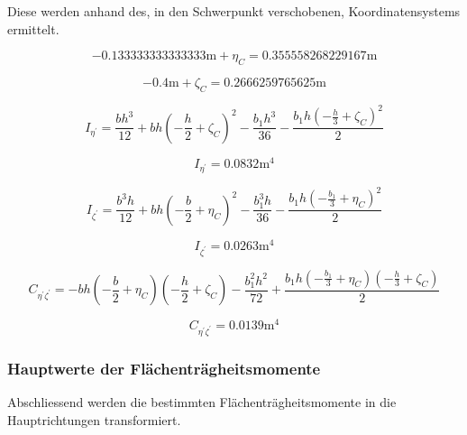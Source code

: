 \documentclass[
  12pt,
  letterpaper,
  DIV=11,
  egregdoesnotlikesansseriftitles]{scrartcl}
\begin{document}
Diese werden anhand des, in den Schwerpunkt verschobenen,
Koordinatensystems ermittelt.

\begin{equation}- 0.133333333333333 \text{m} + \eta_{C} = 0.355558268229167 \text{m}\end{equation}

\begin{equation}- 0.4 \text{m} + \zeta_{C} = 0.2666259765625 \text{m}\end{equation}

\begin{equation}I_{\eta^{'}} = \frac{b h^{3}}{12} + b h \left(- \frac{h}{2} + \zeta_{C}\right)^{2} - \frac{b_{1} h^{3}}{36} - \frac{b_{1} h \left(- \frac{h}{3} + \zeta_{C}\right)^{2}}{2}\end{equation}

\begin{equation}I_{\eta^{'}} = 0.0832 \text{m}^{4}\end{equation}

\begin{equation}I_{\zeta^{'}} = \frac{b^{3} h}{12} + b h \left(- \frac{b}{2} + \eta_{C}\right)^{2} - \frac{b_{1}^{3} h}{36} - \frac{b_{1} h \left(- \frac{b_{1}}{3} + \eta_{C}\right)^{2}}{2}\end{equation}

\begin{equation}I_{\zeta^{'}} = 0.0263 \text{m}^{4}\end{equation}

\begin{equation}C_{\eta^{'}\zeta^{'}} = - b h \left(- \frac{b}{2} + \eta_{C}\right) \left(- \frac{h}{2} + \zeta_{C}\right) - \frac{b_{1}^{2} h^{2}}{72} + \frac{b_{1} h \left(- \frac{b_{1}}{3} + \eta_{C}\right) \left(- \frac{h}{3} + \zeta_{C}\right)}{2}\end{equation}

\begin{equation}C_{\eta^{'}\zeta^{'}} = 0.0139 \text{m}^{4}\end{equation}

\hypertarget{hauptwerte-der-fluxe4chentruxe4gheitsmomente}{%
\subsubsection{Hauptwerte der
Flächenträgheitsmomente}\label{hauptwerte-der-fluxe4chentruxe4gheitsmomente}}

Abschliessend werden die bestimmten Flächenträgheitsmomente in die
Hauptrichtungen transformiert.
\end{document}
